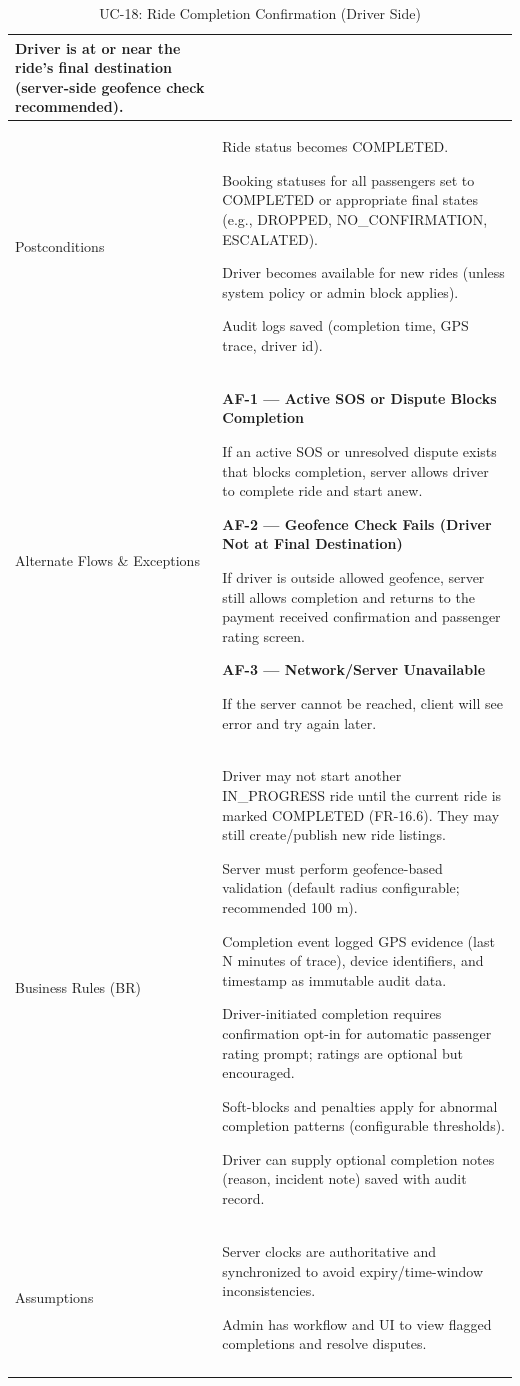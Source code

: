 \begin{longtable}{|p{3.5cm}|p{12cm}|}
Driver is at or near the ride’s final destination (server-side geofence check recommended). \\
\hline
Postconditions &
Ride status becomes COMPLETED.

Booking statuses for all passengers set to COMPLETED or appropriate final states (e.g., DROPPED, NO\_CONFIRMATION, ESCALATED).

Driver becomes available for new rides (unless system policy or admin block applies).

Audit logs saved (completion time, GPS trace, driver id). \\
\hline
Alternate Flows \& Exceptions &
\textbf{AF-1 --- Active SOS or Dispute Blocks Completion}

If an active SOS or unresolved dispute exists that blocks completion, server allows driver to complete ride and start anew.

\textbf{AF-2 --- Geofence Check Fails (Driver Not at Final Destination)}

If driver is outside allowed geofence, server still allows completion and returns to the payment received confirmation and passenger rating screen.

\textbf{AF-3 --- Network/Server Unavailable}

If the server cannot be reached, client will see error and try again later. \\
\hline
Business Rules (BR) &
Driver may not start another IN\_PROGRESS ride until the current ride is marked COMPLETED (FR-16.6). They may still create/publish new ride listings.

Server must perform geofence-based validation (default radius configurable; recommended 100 m).

Completion event logged GPS evidence (last N minutes of trace), device identifiers, and timestamp as immutable audit data.

Driver-initiated completion requires confirmation opt-in for automatic passenger rating prompt; ratings are optional but encouraged.

Soft-blocks and penalties apply for abnormal completion patterns (configurable thresholds).

Driver can supply optional completion notes (reason, incident note) saved with audit record. \\
\hline
Assumptions &
Server clocks are authoritative and synchronized to avoid expiry/time-window inconsistencies.

Admin has workflow and UI to view flagged completions and resolve disputes. \\
\hline
\caption{UC-18: Ride Completion Confirmation (Driver Side)}
\end{longtable}

